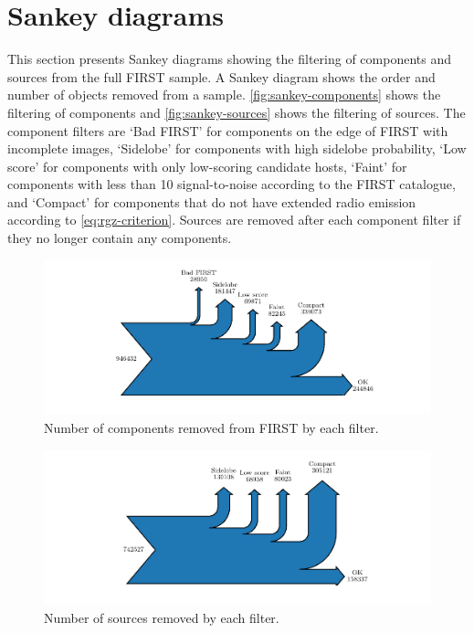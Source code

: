 \appendix

  \section{Sankey diagrams}
  \label{sec:sankey}

    This section presents Sankey diagrams showing the filtering of components and sources from the full FIRST sample. A Sankey diagram shows the order and number of objects removed from a sample. \autoref{fig:sankey-components} shows the filtering of components and \autoref{fig:sankey-sources} shows the filtering of sources. The component filters are `Bad FIRST' for components on the edge of FIRST with incomplete images, `Sidelobe' for components with high sidelobe probability, `Low score' for components with only low-scoring candidate hosts, `Faint' for components with less than 10 signal-to-noise according to the FIRST catalogue, and `Compact' for components that do not have extended radio emission according to \autoref{eq:rgz-criterion}. Sources are removed after each component filter if they no longer contain any components.

    \begin{figure}
        \centering
        \includegraphics{rlf-images/sankey_components.pdf}
        \caption{\label{fig:sankey-components} Number of components removed from FIRST by each filter.}
    \end{figure}

    \begin{figure}
        \centering
        \includegraphics{rlf-images/sankey_sources.pdf}
        \caption{\label{fig:sankey-sources} Number of sources removed by each filter.}
    \end{figure}

